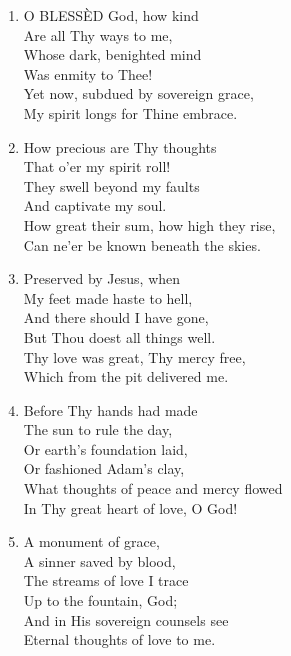 \documentclass[11pt,a4paper]{article}
\begin{document}
\begin{enumerate}
    \item O BLESS\`ED God, how kind \\
        Are all Thy ways to me, \\
        Whose dark, benighted mind \\
        Was enmity to Thee! \\
        Yet now, subdued by sovereign grace, \\
        My spirit longs for Thine embrace.

    \item How precious are Thy thoughts \\
        That o'er my spirit roll! \\
        They swell beyond my faults \\
        And captivate my soul. \\
        How great their sum, how high they rise, \\
        Can ne'er be known beneath the skies.

    \item Preserved by Jesus, when \\
        My feet made haste to hell, \\
        And there should I have gone, \\
        But Thou doest all things well. \\
        Thy love was great, Thy mercy free, \\
        Which from the pit delivered me.

    \item Before Thy hands had made \\
        The sun to rule the day, \\
        Or earth's foundation laid, \\
        Or fashioned Adam's clay, \\
        What thoughts of peace and mercy flowed \\
        In Thy great heart of love, O God!

    \item A monument of grace, \\
        A sinner saved by blood, \\
        The streams of love I trace \\
        Up to the fountain, God; \\
        And in His sovereign counsels see \\
        Eternal thoughts of love to me.

\end{enumerate}
\end{document}
